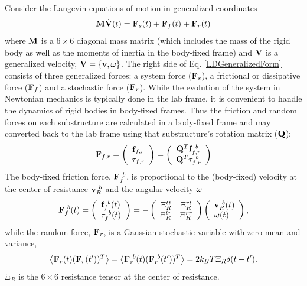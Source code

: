 \documentclass[letterpaper]{report}
\begin{document}
Consider the Langevin equations of motion in generalized coordinates
\begin{equation}
{\bf M} \dot{{\bf V}}(t) = {\bf F}_{s}(t) +
{\bf F}_{f}(t)  + {\bf F}_{r}(t) 
\label{LDGeneralizedForm}
\end{equation}
where ${\bf M}$ is a $6 \times 6$ diagonal mass matrix (which
includes the mass of the rigid body as well as the moments of inertia
in the body-fixed frame) and ${\bf V}$ is a generalized velocity,
${\bf V} =
\left\{{\bf v},{\bf \omega}\right\}$. The right side of
Eq. \ref{LDGeneralizedForm} consists of three generalized forces: a
system force (${\bf F}_{s}$), a frictional or dissipative force (${\bf
F}_{f}$) and a stochastic force (${\bf F}_{r}$). While the evolution
of the system in Newtonian mechanics is typically done in the lab
frame, it is convenient to handle the dynamics of rigid bodies in
body-fixed frames. Thus the friction and random forces on each
substructure are calculated in a body-fixed frame and may converted
back to the lab frame using that substructure's rotation matrix (${\bf
Q}$):
\begin{equation}
{\bf F}_{f,r} = 
\left( \begin{array}{c}
{\bf f}_{f,r} \\
{\bf \tau}_{f,r}
\end{array} \right)
=
\left( \begin{array}{c}
{\bf Q}^{T} {\bf f}^{~b}_{f,r} \\
{\bf Q}^{T} {\bf \tau}^{~b}_{f,r}
\end{array} \right)
\end{equation}
The body-fixed friction force, ${\bf F}_{f}^{~b}$, is proportional to
the (body-fixed) velocity at the center of resistance
${\bf v}_{R}^{~b}$ and the angular velocity ${\bf \omega}$
\begin{equation}
{\bf F}_{f}^{~b}(t) = \left( \begin{array}{l}
 {\bf f}_{f}^{~b}(t) \\
 {\bf \tau}_{f}^{~b}(t) \\
 \end{array} \right) =  - \left( \begin{array}{*{20}c}
   \Xi_{R}^{tt} & \Xi_{R}^{rt} \\
   \Xi_{R}^{tr} & \Xi_{R}^{rr}    \\
\end{array} \right)\left( \begin{array}{l}
 {\bf v}_{R}^{~b}(t) \\
 {\bf \omega}(t) \\
 \end{array} \right),
\end{equation}
while the random force, ${\bf F}_{r}$, is a Gaussian stochastic
variable with zero mean and variance,
\begin{equation}
\left\langle {{\bf F}_{r}(t) ({\bf F}_{r}(t'))^T } \right\rangle  =
\left\langle {{\bf F}_{r}^{~b} (t) ({\bf F}_{r}^{~b} (t'))^T } \right\rangle  =
2 k_B T \Xi_R \delta(t - t'). \label{eq:randomForce}
\end{equation}
$\Xi_R$ is the $6\times6$ resistance tensor at the center of
resistance.  
\end{document}
